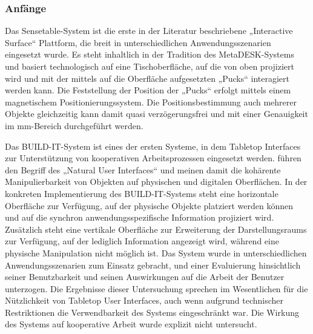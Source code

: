 \subsubsection{Anfänge} %
\label{subs:anfaenge}

Das Sensetable-System \citep{Patten01} ist die erste in der Literatur beschriebene „Interactive Surface“ Plattform, die breit in unterschiedlichen Anwendungsszenarien eingesetzt wurde. Es steht inhaltlich in der Tradition des MetaDESK-Systems \citep{Ishii97} und basiert technologisch auf eine Tischoberfläche, auf die von oben projiziert wird und mit der mittels auf die Oberfläche aufgesetzten „Pucks“ interagiert werden kann. Die Feststellung der Position der „Pucks“ erfolgt mittels einem magnetischem Positionierungssystem. Die Positionsbestimmung auch mehrerer Objekte gleichzeitig kann damit quasi verzögerungsfrei und mit einer Genauigkeit im mm-Bereich durchgeführt werden.

Das BUILD-IT-System \citep{Fjeld01} ist eines der ersten Systeme, in dem Tabletop Interfaces zur Unterstützung von kooperativen Arbeitsprozessen eingesetzt werden. \citet{Fjeld97} führen den Begriff des „Natural User Interfaces“ und meinen damit die kohärente Manipulierbarkeit von Objekten auf physischen und digitalen Oberflächen. In der konkreten Implementierung des BUILD-IT-Systems \citep{Fjeld01} steht eine horizontale Oberfläche zur Verfügung, auf der physische Objekte platziert werden können und auf die synchron anwendungsspezifische Information projiziert wird. Zusätzlich steht eine vertikale Oberfläche zur Erweiterung der Darstellungsraums zur Verfügung, auf der lediglich Information angezeigt wird, während eine physische Manipulation nicht möglich ist. Das System wurde in unterschiedlichen Anwendungsszenarien zum Einsatz gebracht, und einer Evaluierung hinsichtlich seiner Benutzbarkeit und seinen Auswirkungen auf die Arbeit der Benutzer unterzogen. Die Ergebnisse dieser Untersuchung sprechen im Wesentlichen für die Nützlichkeit von Tabletop User Interfaces, auch wenn aufgrund technischer Restriktionen die Verwendbarkeit des Systems eingeschränkt war. Die Wirkung des Systems auf kooperative Arbeit wurde explizit nicht untersucht.  


